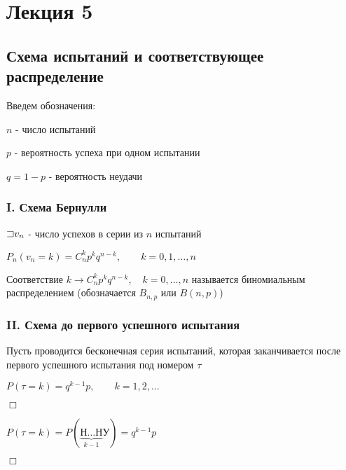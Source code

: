 \documentclass[12pt]{article}
\begin{document}
    \section{Лекция 5}

    \subsection{Схема испытаний и соответствующее распределение}

    Введем обозначения:

    $n$ - число испытаний

    $p$ - вероятность успеха при одном испытании

    $q = 1 - p$ - вероятность неудачи

    \hypertarget{bernoullischema2}{}

    \subsubsection{I. Схема Бернулли}

    $\mathord{\sqsupset} v_n$ - число успехов в серии из $n$ испытаний

    $P_n(v_n = k) = C^k_n p^k q^{n - k}, \quad\quad k = 0, 1, \dots, n$

    \hypertarget{binomialdistribution}{}

    \Def Соответствие $k \rightarrow C^k_n p^k q^{n - k}, \quad k = 0, \dots, n$ называется биномиальным распределением
    (обозначается $B_{n,p}$ или $B(n, p)$)

    \hypertarget{untilfirstsuccessschema}{}

    \subsubsection{II. Схема до первого успешного испытания}

    Пусть проводится бесконечная серия испытаний, которая заканчивается после первого успешного испытания
    под номером $\tau$

    \begin{MyTheorem}
        \Ths $P(\tau = k) = q^{k - 1} p, \quad\quad k = 1, 2, \dots$
    \end{MyTheorem}

    \begin{MyProof}
        $\Box$

        $P(\tau = k) = P(\underset{k - 1}{\underbrace{\text{Н}\dots\text{Н}}}\text{У}) = q^{k - 1}p$

        $\Box$
    \end{MyProof}
\end{document}
